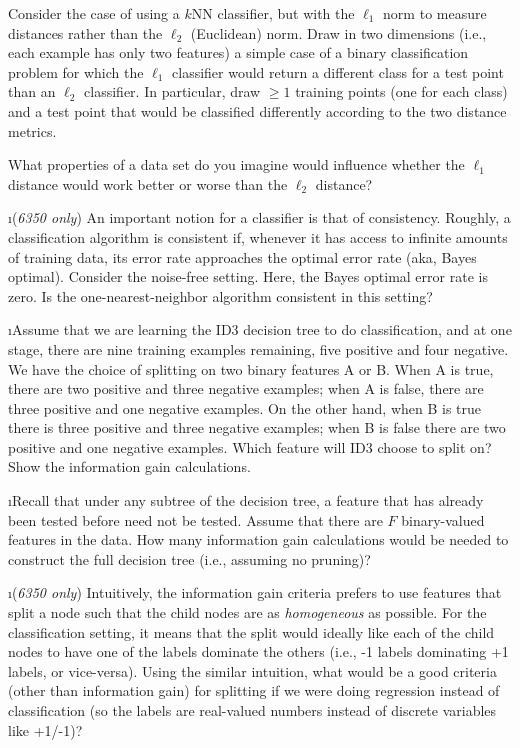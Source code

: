 \documentclass[fleqn]{article}
\begin{document}
Consider the case of using a $k$NN classifier, but with the $\ell_1$
norm to measure distances rather than the $\ell_2$ (Euclidean) norm.
Draw in two dimensions (i.e., each example has only two features) 
a simple case of a binary classification problem for which the 
$\ell_1$ classifier would return a different class for a test point 
than an $\ell_2$ classifier.  In particular, draw $\geq 1$ training 
points (one for each class) and a test point that would be classified 
differently according to the two distance metrics.

What properties of a data set do you imagine would influence whether
the $\ell_1$ distance would work better or worse than the $\ell_2$
distance?

\i (\textit{6350 only}) An important notion for a classifier is that 
of consistency. Roughly, a classification algorithm is consistent if, 
whenever it has access to infinite amounts of training data, its error rate
approaches the optimal error rate (aka, Bayes optimal). Consider the 
noise-free setting. Here, the Bayes optimal error rate is zero. Is the 
one-nearest-neighbor algorithm consistent in this setting?

\i Assume that we are learning the ID3 decision tree to do classification, and
 at one stage, there are nine training examples remaining, five positive and 
four negative. We have the choice of splitting on two binary features A or B. 
When A is true, there are two positive and three negative examples; when A is 
false, there are three positive and one negative examples. On the other hand, 
when B is true there is three positive and three negative examples; when B is 
false there are two positive and one negative examples. Which feature will ID3 
choose to split on? Show the information gain calculations.

\i Recall that under any subtree of the decision tree, a feature that has already 
been tested before need not be tested. Assume that there are $F$ binary-valued 
features in the data. How many information gain calculations would be needed to 
construct the full decision tree (i.e., assuming no pruning)?

\i (\textit{6350 only}) Intuitively, the information gain criteria prefers to use 
features that split a node such that the child nodes are as \textit{homogeneous} 
as possible. For the classification setting, it means that the split would ideally 
like each of the child nodes to have one of the labels dominate the others (i.e., 
-1 labels dominating +1 labels, or vice-versa). Using the similar intuition, what 
would be a good criteria (other than information gain) for splitting if we were 
doing regression instead of classification (so the labels are real-valued numbers 
instead of discrete variables like +1/-1)?
\end{document}
